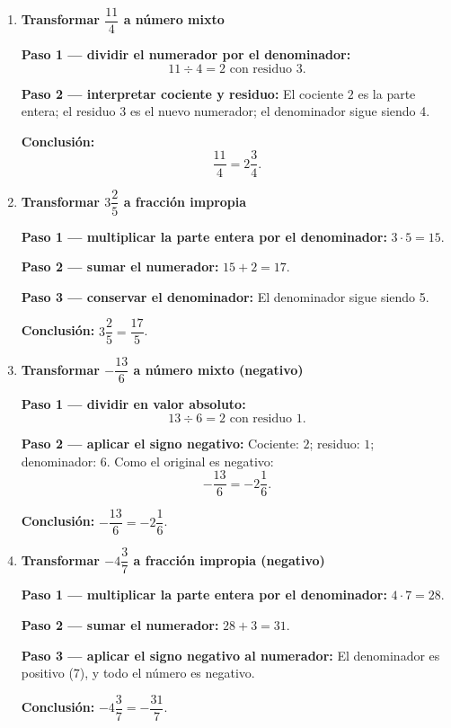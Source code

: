 \documentclass[11pt, letterpaper]{article}
\begin{document}
\begin{tcolorbox}[examplebox, title={Ejemplos --- Convertir entre formas}]
\begin{enumerate}[label=\textbf{Ej. \arabic*.}, leftmargin=*, itemsep=14pt]

\item \textbf{Transformar $\dfrac{11}{4}$ a n\'umero mixto}

\textbf{Paso 1 --- dividir el numerador por el denominador:}
$$11\div 4 = 2 \text{ con residuo } 3.$$

\medskip
\textbf{Paso 2 --- interpretar cociente y residuo:}
El cociente $2$ es la parte entera; el residuo $3$ es el nuevo numerador; el denominador sigue siendo 4.

\medskip
\textbf{Conclusi\'on:}
$$\frac{11}{4}=2\frac{3}{4}.$$

\item \textbf{Transformar $3\dfrac{2}{5}$ a fracci\'on impropia}

\textbf{Paso 1 --- multiplicar la parte entera por el denominador:}
$3\cdot 5=15$.

\medskip
\textbf{Paso 2 --- sumar el numerador:}
$15+2=17$.

\medskip
\textbf{Paso 3 --- conservar el denominador:}
El denominador sigue siendo 5.

\medskip
\textbf{Conclusi\'on:}
$3\dfrac{2}{5}=\dfrac{17}{5}$.

\item \textbf{Transformar $-\dfrac{13}{6}$ a n\'umero mixto (negativo)}

\textbf{Paso 1 --- dividir en valor absoluto:}
$$13\div 6 = 2 \text{ con residuo } 1.$$

\medskip
\textbf{Paso 2 --- aplicar el signo negativo:}
Cociente: $2$; residuo: $1$; denominador: $6$. Como el original es negativo:
$$-\frac{13}{6}=-2\frac{1}{6}.$$

\medskip
\textbf{Conclusi\'on:}
$-\dfrac{13}{6}=-2\dfrac{1}{6}$.

\item \textbf{Transformar $-4\dfrac{3}{7}$ a fracci\'on impropia (negativo)}

\textbf{Paso 1 --- multiplicar la parte entera por el denominador:}
$4\cdot 7=28$.

\medskip
\textbf{Paso 2 --- sumar el numerador:}
$28+3=31$.

\medskip
\textbf{Paso 3 --- aplicar el signo negativo al numerador:}
El denominador es positivo (7), y todo el n\'umero es negativo.

\medskip
\textbf{Conclusi\'on:}
$-4\dfrac{3}{7}=-\dfrac{31}{7}$.

\end{enumerate}
\end{tcolorbox}
\end{document}
